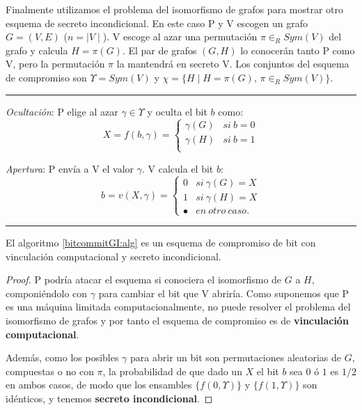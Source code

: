 \hfil

Finalmente utilizamos el problema del isomorfismo de grafos para mostrar otro esquema de secreto incondicional. En este caso P y V escogen un grafo $G=(V,E)$ ($n=\mid V \mid $). V escoge al azar una permutación $\pi \in_R Sym(V)$ del grafo y calcula $H=\pi(G)$. El par de grafos $(G,H)$ lo conocerán tanto P como V, pero la permutación $\pi$ la mantendrá en secreto V. Los conjuntos del esquema de compromiso son $\Upsilon = Sym(V)$ y $\chi = \{ H \mid H=\pi(G),\, \pi\in_R Sym(V) \}$.


\hfil

\rule{\textwidth}{1pt}
\begin{algorithm}
	\hfil
	
	\textit{Ocultación}: P elige al azar $\gamma \in \Upsilon$ y oculta el bit $b$ como:
	\[X = f(b,\gamma) = 
	\begin{cases}
	\gamma(G) & si\ b=0 \\
	\gamma(H) & si\ b=1 \\
	\end{cases}
	\]
	
	\textit{Apertura}: P envía a V el valor $\gamma$. V calcula el bit $b$:
	\[ b = v(X,\gamma) = 
	\begin{cases}
	0  & si\ \gamma(G)=X \\
	1 & si\ \gamma(H)=X \\
	\bullet & en\ otro\ caso.
	\end{cases}
	\]
	\label{bitcommitGI:alg}
\end{algorithm}
\rule{\textwidth}{1pt}

\hfil

\begin{proposition}
	El algoritmo \ref{bitcommitGI:alg} es un esquema de compromiso de bit con vinculación computacional y secreto incondicional.
\end{proposition}

\begin{proof}
	P podría atacar el esquema si conociera el isomorfismo de $G$ a $H$, componiéndolo con $\gamma$ para cambiar el bit que V abriría. Como suponemos que P es una máquina limitada computacionalmente, no puede resolver el problema del isomorfismo de grafos y por tanto el esquema de compromiso es de \textbf{vinculación computacional}.
	
	Además, como los posibles $\gamma$ para abrir un bit son permutaciones aleatorias de $G$, compuestas o no con $\pi$, la probabilidad de que dado un $X$ el bit $b$ sea $0$ ó $1$ es $1/2$ en ambos casos, de modo que los ensambles $\{f(0,\Upsilon)\}$ y $\{f(1,\Upsilon)\}$ son idénticos, y tenemos \textbf{secreto incondicional}.
\end{proof}


